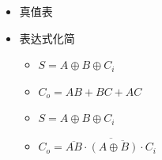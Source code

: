 \documentclass[UTF8]{ctexart}
\begin{document}
\begin{enumerate}
\begin{itemize}
\begin{itemize}
\begin{itemize}
                                  \item 真值表\\

                                        \vspace{1\baselineskip}

                                        \newpage
                                  \item 表达式化简\\
                                        \begin{itemize}
                                            \centering
                                            \Large
                                            \item $S=A\oplus B\oplus C_i$
                                            \item $C_o=AB+BC+AC$
                                            \item $S=A\oplus B\oplus C_i$
                                            \item $C_o=\overline{\overline{AB}\cdot\overline{(A\oplus B)\cdot C_i}}$
                                        \end{itemize}


\end{itemize}
\end{itemize}
\end{itemize}
\end{enumerate}
\end{document}
